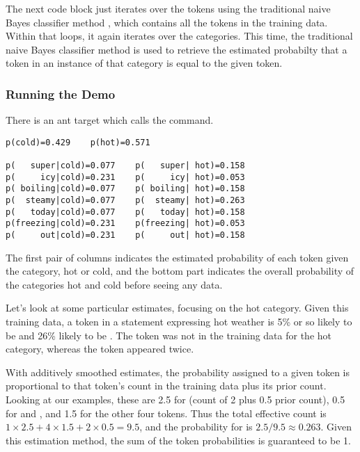 The next code block just iterates over the tokens using the
traditional naive Bayes classifier method ,
which contains all the tokens in the training data.  Within that
loops, it again iterates over the categories.  This time, the
traditional naive Bayes classifier method  is
used to retrieve the estimated probabilty that a token in 
an instance of that category is equal to the given token.
%



\subsubsection{Running the Demo}

There is an ant target  which calls the 
command.

\begin{verbatim}
p(cold)=0.429    p(hot)=0.571

p(   super|cold)=0.077    p(   super| hot)=0.158
p(     icy|cold)=0.231    p(     icy| hot)=0.053
p( boiling|cold)=0.077    p( boiling| hot)=0.158
p(  steamy|cold)=0.077    p(  steamy| hot)=0.263
p(   today|cold)=0.077    p(   today| hot)=0.158
p(freezing|cold)=0.231    p(freezing| hot)=0.053
p(     out|cold)=0.231    p(     out| hot)=0.158
\end{verbatim}
%
The first pair of columns indicates the estimated probability of each
token given the category, hot or cold, and the bottom part indicates
the overall probability of the categories hot and cold before seeing
any data.  

Let's look at some particular estimates, focusing on the hot category.
Given this training data, a token in a statement expressing hot
weather is 5\% or so likely to be  and 26\% likely
to be .  The token  was
not in the training data for the hot category, whereas the token
 appeared twice.  

With additively smoothed estimates, the probability assigned to a
given token is proportional to that token's count in the training data
plus its prior count.  Looking at our examples, these are 2.5 for
 (count of 2 plus 0.5 prior count), 0.5 for
 and , and 1.5 for the
other four tokens.  Thus the total effective count is $1 \times 2.5 +
4 \times 1.5 + 2 \times 0.5 = 9.5$, and the probability for
 is $2.5/9.5 \approx 0.263$.  Given this
estimation method, the sum of the token probabilities is guaranteed to
be 1.

